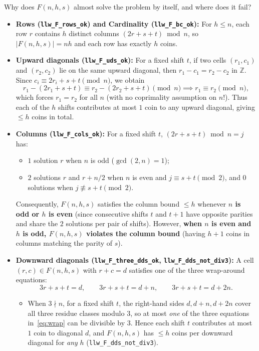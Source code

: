 \documentclass[11pt,a4paper]{article}
\theoremstyle{remark}
\begin{document}
Why does $F(n, h, s)$ almost solve the problem by itself, and where does it fail?
\begin{itemize}
  \item \textbf{Rows (\texttt{llw\_F\_rows\_ok}) and Cardinality (\texttt{llw\_F\_bc\_ok}):} For $h \le n$, each row $r$ contains $h$ distinct columns $(2r + s + t) \bmod n$, so $|F(n, h, s)| = nh$ and each row has exactly $h$ coins.
  \item \textbf{Upward diagonals (\texttt{llw\_F\_uds\_ok}):} For a fixed shift $t$, if two cells $(r_1, c_1)$ and $(r_2, c_2)$ lie on the same upward diagonal, then $r_1 - c_1 = r_2 - c_2$ in $\mathbb{Z}$. Since $c_i \equiv 2r_i + s + t \pmod n$, we obtain
  \[
    r_1 - (2r_1 + s + t) \equiv r_2 - (2r_2 + s + t) \pmod n \implies r_1 \equiv r_2 \pmod n,
  \]
  which forces $r_1 = r_2$ for all $n$ (with no coprimality assumption on $n$!). Thus each of the $h$ shifts contributes at most $1$ coin to any upward diagonal, giving $\le h$ coins in total.
  \item \textbf{Columns (\texttt{llw\_F\_cols\_ok}):} For a fixed shift $t$, $(2r + s + t) \bmod n = j$ has:
  \begin{itemize}[nosep]
    \item $1$ solution $r$ when $n$ is odd ($\gcd(2, n) = 1$);
    \item $2$ solutions $r$ and $r + n/2$ when $n$ is even and $j \equiv s + t \pmod 2$, and $0$ solutions when $j \not\equiv s + t \pmod 2$.
  \end{itemize}
  Consequently, $F(n, h, s)$ satisfies the column bound $\le h$ whenever \textbf{$n$ is odd or $h$ is even} (since consecutive shifts $t$ and $t+1$ have opposite parities and share the $2$ solutions per pair of shifts). However, \textbf{when $n$ is even and $h$ is odd, $F(n, h, s)$ violates the column bound} (having $h + 1$ coins in columns matching the parity of $s$).
  \item \textbf{Downward diagonals (\texttt{llw\_F\_three\_dds\_ok}, \texttt{llw\_F\_dds\_not\_div3}):} A cell $(r, c) \in F(n, h, s)$ with $r + c = d$ satisfies one of the three wrap-around equations:
  \begin{equation}
  \label{eq:wrap}
    3r + s + t = d, \qquad 3r + s + t = d + n, \qquad 3r + s + t = d + 2n.
  \end{equation}
  \begin{itemize}[nosep]
    \item When $3 \nmid n$, for a fixed shift $t$, the right-hand sides $d, d + n, d + 2n$ cover all three residue classes modulo $3$, so at most \emph{one} of the three equations in~\eqref{eq:wrap} can be divisible by $3$. Hence each shift $t$ contributes at most $1$ coin to diagonal $d$, and $F(n, h, s)$ has $\le h$ coins per downward diagonal for \emph{any} $h$ (\texttt{llw\_F\_dds\_not\_div3}).

\end{itemize}
\end{itemize}
\end{document}
